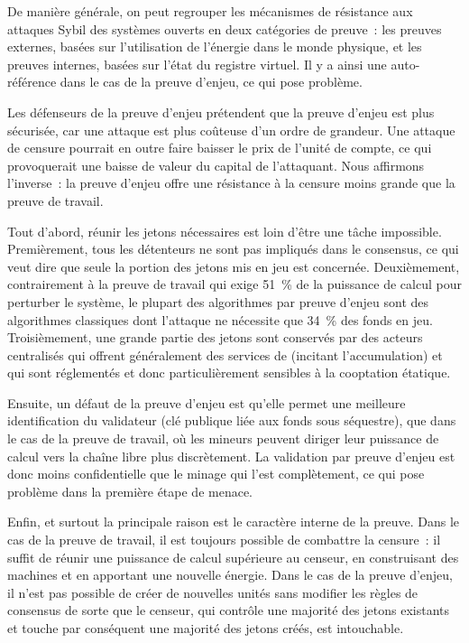 De manière générale, on peut regrouper les mécanismes de résistance aux attaques Sybil des systèmes ouverts en deux catégories de preuve~: les preuves externes, basées sur l'utilisation de l'énergie dans le monde physique, et les preuves internes, basées sur l'état du registre virtuel. Il y a ainsi une auto-référence dans le cas de la preuve d'enjeu, ce qui pose problème.


Les défenseurs de la preuve d'enjeu prétendent que la preuve d'enjeu est plus sécurisée, car une attaque est plus coûteuse d'un ordre de grandeur. Une attaque de censure pourrait en outre faire baisser le prix de l'unité de compte, ce qui provoquerait une baisse de valeur du capital de l'attaquant. Nous affirmons l'inverse~: la preuve d'enjeu offre une résistance à la censure moins grande que la preuve de travail.

Tout d'abord, réunir les jetons nécessaires est loin d'être une tâche impossible. Premièrement, tous les détenteurs ne sont pas impliqués dans le consensus, ce qui veut dire que seule la portion des jetons mis en jeu est concernée. Deuxièmement, contrairement à la preuve de travail qui exige 51~\% de la puissance de calcul pour perturber le système, le plupart des algorithmes par preuve d'enjeu sont des algorithmes classiques dont l'attaque ne nécessite que 34~\% des fonds en jeu. Troisièmement, une grande partie des jetons sont conservés par des acteurs centralisés qui offrent généralement des services de  (incitant l'accumulation) et qui sont réglementés et donc particulièrement sensibles à la cooptation étatique.

Ensuite, un défaut de la preuve d'enjeu est qu'elle permet une meilleure identification du validateur (clé publique liée aux fonds sous séquestre), que dans le cas de la preuve de travail, où les mineurs peuvent diriger leur puissance de calcul vers la chaîne libre plus discrètement. La validation par preuve d'enjeu est donc moins confidentielle que le minage qui l'est complètement, ce qui pose problème dans la première étape de menace.

Enfin, et surtout la principale raison est le caractère interne de la preuve. Dans le cas de la preuve de travail, il est toujours possible de combattre la censure~: il suffit de réunir une puissance de calcul supérieure au censeur, en construisant des machines et en apportant une nouvelle énergie. Dans le cas de la preuve d'enjeu, il n'est pas possible de créer de nouvelles unités sans modifier les règles de consensus de sorte que le censeur, qui contrôle une majorité des jetons existants et touche par conséquent une majorité des jetons créés, est intouchable.


